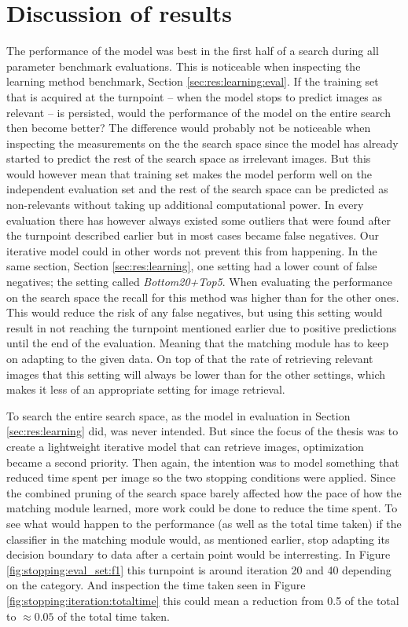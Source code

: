 
\section{Discussion of results}
\label{sec:concl:meas}
The performance of the model was best in the first half of a search during all parameter benchmark evaluations. This is noticeable when inspecting the learning method benchmark, Section \ref{sec:res:learning:eval}. If the training set that is acquired at the turnpoint -- when the model stops to predict images as relevant -- is persisted, would the performance of the model on the entire search then become better? The difference would probably not be noticeable when inspecting the measurements on the the search space since the model has already started to predict the rest of the search space as irrelevant images. But this would however mean that training set makes the model perform well on the independent evaluation set and the rest of the search space can be predicted as non-relevants without taking up additional computational power. In every evaluation there has however always existed some outliers that were found after the turnpoint described earlier but in most cases became false negatives. Our iterative model could in other words not prevent this from happening. 
In the same section, Section \ref{sec:res:learning}, one setting had a lower count of false negatives; the setting called \emph{Bottom20+Top5}. When evaluating the performance on the search space the recall for this method was higher than for the other ones. This would reduce the risk of any false negatives, but using this setting would result in not reaching the turnpoint mentioned earlier due to positive predictions until the end of the evaluation. Meaning that the matching module has to keep on adapting to the given data. On top of that the rate of retrieving relevant images that this setting will always be lower than for the other settings, which makes it less of an appropriate setting for image retrieval. 

To search the entire search space, as the model in evaluation in Section \ref{sec:res:learning} did, was never intended. But since the focus of the thesis was to create a lightweight iterative model that can retrieve images, optimization became a second priority. Then again, the intention was to model something that reduced time spent per image so the two stopping 
conditions were applied. Since the combined pruning of the search space barely affected how the pace of how the matching module learned, more work could be done to reduce the time spent. To see what would happen to the performance (as well as the total time taken) if the classifier in the matching module would, as mentioned earlier, stop adapting its decision boundary to data after a certain point would be interresting. In Figure \ref{fig:stopping:eval_set:f1} this turnpoint is around iteration 20 and 40 depending on the category. And inspection the time taken seen in Figure \ref{fig:stopping:iteration:totaltime} this could mean a reduction from 0.5 of the total to $\approx0.05$ of the total time taken.  

